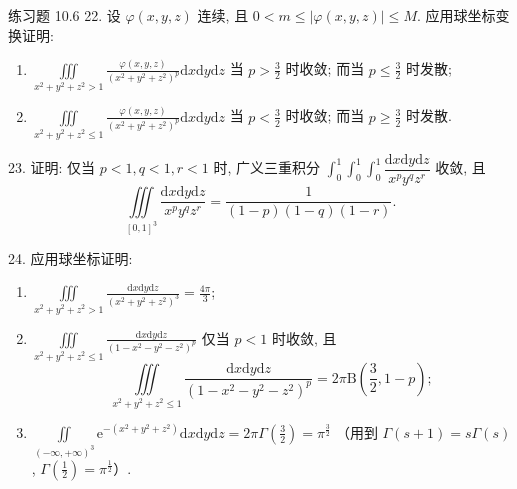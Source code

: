 \begin{exblock}{练习题 10.6}
22. 设 $\varphi(x,y,z)$ 连续, 且 $0 < m \leqslant |\varphi(x,y,z)| \leqslant M$.
应用球坐标变换证明:
\begin{enumerate}
\item[(1)] $\displaystyle \iiint\limits_{x^{2}+y^{2}+z^{2} > 1}
\frac{\varphi(x,y,z)}{(x^{2}+y^{2}+z^{2})^{p}} \mathrm{d}x\mathrm{d}y\mathrm{d}z$
当 $p > \frac{3}{2}$ 时收敛; 而当 $p \leqslant \frac{3}{2}$ 时发散;
\item[(2)] $\displaystyle \iiint\limits_{x^{2}+y^{2}+z^{2} \leqslant 1}
\frac{\varphi(x,y,z)}{(x^{2}+y^{2}+z^{2})^{p}} \mathrm{d}x\mathrm{d}y\mathrm{d}z$
当 $p < \frac{3}{2}$ 时收敛; 而当 $p \geqslant \frac{3}{2}$ 时发散.
\end{enumerate}

23. 证明: 仅当 $p < 1, q < 1, r < 1$ 时, 广义三重积分
$\displaystyle \int_{0}^{1} \int_{0}^{1} \int_{0}^{1}
\dfrac{\mathrm{d}x\mathrm{d}y\mathrm{d}z}{x^{p}y^{q}z^{r}}$
收敛, 且
\[
\iiint\limits_{[0,1]^{3}} \frac{\mathrm{d}x\mathrm{d}y\mathrm{d}z}{x^{p}y^{q}z^{r}}
= \frac{1}{(1-p)(1-q)(1-r)}.
\]

24. 应用球坐标证明:
\begin{enumerate}
\item[(1)] $\displaystyle \iiint\limits_{x^{2}+y^{2}+z^{2} > 1}
\frac{\mathrm{d}x\mathrm{d}y\mathrm{d}z}{(x^{2}+y^{2}+z^{2})^{3}} = \frac{4\pi}{3}$;
\item[(2)] $\displaystyle \iiint\limits_{x^{2}+y^{2}+z^{2} \leqslant 1}
\frac{\mathrm{d}x\mathrm{d}y\mathrm{d}z}{(1-x^{2}-y^{2}-z^{2})^{p}}$
仅当 $p < 1$ 时收敛, 且
\[
\iiint\limits_{x^{2}+y^{2}+z^{2} \leqslant 1}
\frac{\mathrm{d}x\mathrm{d}y\mathrm{d}z}{(1-x^{2}-y^{2}-z^{2})^{p}}
= 2\pi \mathrm{B}\left( \frac{3}{2}, 1-p \right);
\]
\item[(3)] $\displaystyle \iint\limits_{(-\infty,+\infty)^{3}}
\mathrm{e}^{-(x^{2}+y^{2}+z^{2})} \mathrm{d}x\mathrm{d}y\mathrm{d}z
= 2\pi \Gamma\left( \frac{3}{2} \right) = \pi^{\frac{3}{2}}$
（用到 $\Gamma(s+1) = s\Gamma(s)$, $\Gamma\left( \frac{1}{2} \right) = \pi^{\frac{1}{2}}$）.
\end{enumerate}

\end{exblock}

